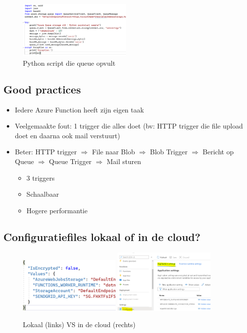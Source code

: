 \documentclass{article}
\begin{document}
\begin{figure}[H]
    \centering
    \includegraphics[width=0.5\textwidth]{scenario-3-3.png}
    \caption{Python script die queue opvult}
\end{figure}

\subsection{Good practices}

\begin{itemize}
    \item Iedere Azure Function heeft zijn eigen taak
    \item Veelgemaakte fout: 1 trigger die alles doet (bv: HTTP trigger die file upload doet en daarna ook mail verstuurt)
    \item Beter: HTTP trigger $\Rightarrow$ File naar Blob $\Rightarrow$ Blob Trigger $\Rightarrow$ Bericht op Queue $\Rightarrow$ Queue Trigger $\Rightarrow$ Mail sturen
    \begin{itemize}
        \item 3 triggers
        \item Schaalbaar
        \item Hogere performantie
    \end{itemize}
\end{itemize}

\subsection{Configuratiefiles lokaal of in de cloud?}

\begin{figure}[H]
    \centering
    \includegraphics[width=0.45\textwidth]{configuratie-lokaal.png}
    \includegraphics[width=0.45\textwidth]{configuratie-cloud.png}
    \caption{Lokaal (links) VS in de cloud (rechts)}
\end{figure}
\end{document}
